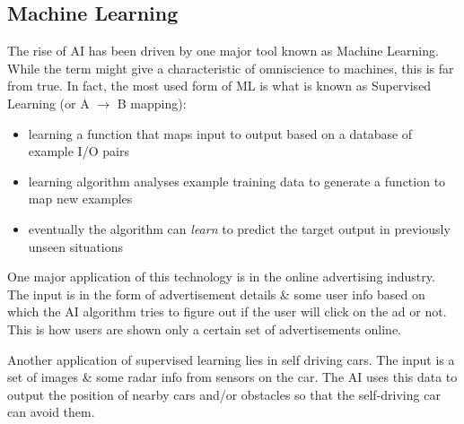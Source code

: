\documentclass{article}[a4paper,12pt]
\theoremstyle{definition}
\begin{document}
\subsection{Machine Learning}
The rise of AI has been driven by one major tool known as Machine Learning. While the term might give a characteristic of omniscience to machines, this is far from true. In fact, the most used form of ML is what is known as Supervised Learning (or A $\rightarrow$ B mapping):
\begin{itemize}
	\item learning a function that maps input to output based on a database of example I/O pairs
	\item learning algorithm analyses example training data to generate a function to map new examples
	\item eventually the algorithm can \textit{learn} to predict the target output in previously unseen situations
\end{itemize}
One major application of this technology is in the online advertising industry. The input is in the form of advertisement details \& some user info based on which the AI algorithm tries to figure out if the user will click on the ad or not. This is how users are shown only a certain set of advertisements online.
\vspace{6pt}

Another application of supervised learning lies in self driving cars. The input is a set of images \& some radar info from sensors on the car. The AI uses this data to output the position of nearby cars and/or obstacles so that the self-driving car can avoid them. 
\vspace{6pt}
\end{document}
